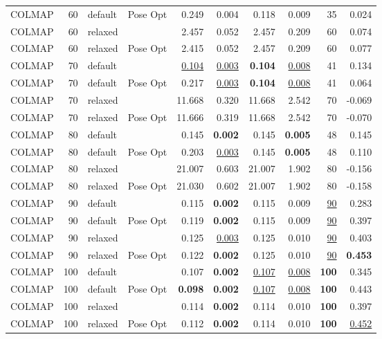 \begin{table}[H]
\begin{tabular}{lrllrrrrrr}
COLMAP & 60 & default & Pose Opt & 0.249 & 0.004 & 0.118 & 0.009 & 35 & 0.024 \\
COLMAP & 60 & relaxed &  & 2.457 & 0.052 & 2.457 & 0.209 & 60 & 0.074 \\
COLMAP & 60 & relaxed & Pose Opt & 2.415 & 0.052 & 2.457 & 0.209 & 60 & 0.077 \\
COLMAP & 70 & default &  & \underline{0.104} & \underline{0.003} & \textbf{0.104} & \underline{0.008} & 41 & 0.134 \\
COLMAP & 70 & default & Pose Opt & 0.217 & \underline{0.003} & \textbf{0.104} & \underline{0.008} & 41 & 0.064 \\
COLMAP & 70 & relaxed &  & 11.668 & 0.320 & 11.668 & 2.542 & 70 & -0.069 \\
COLMAP & 70 & relaxed & Pose Opt & 11.666 & 0.319 & 11.668 & 2.542 & 70 & -0.070 \\
COLMAP & 80 & default &  & 0.145 & \textbf{0.002} & 0.145 & \textbf{0.005} & 48 & 0.145 \\
COLMAP & 80 & default & Pose Opt & 0.203 & \underline{0.003} & 0.145 & \textbf{0.005} & 48 & 0.110 \\
COLMAP & 80 & relaxed &  & 21.007 & 0.603 & 21.007 & 1.902 & 80 & -0.156 \\
COLMAP & 80 & relaxed & Pose Opt & 21.030 & 0.602 & 21.007 & 1.902 & 80 & -0.158 \\
COLMAP & 90 & default &  & 0.115 & \textbf{0.002} & 0.115 & 0.009 & \underline{90} & 0.283 \\
COLMAP & 90 & default & Pose Opt & 0.119 & \textbf{0.002} & 0.115 & 0.009 & \underline{90} & 0.397 \\
COLMAP & 90 & relaxed &  & 0.125 & \underline{0.003} & 0.125 & 0.010 & \underline{90} & 0.403 \\
COLMAP & 90 & relaxed & Pose Opt & 0.122 & \textbf{0.002} & 0.125 & 0.010 & \underline{90} & \textbf{0.453} \\
COLMAP & 100 & default &  & 0.107 & \textbf{0.002} & \underline{0.107} & \underline{0.008} & \textbf{100} & 0.345 \\
COLMAP & 100 & default & Pose Opt & \textbf{0.098} & \textbf{0.002} & \underline{0.107} & \underline{0.008} & \textbf{100} & 0.443 \\
COLMAP & 100 & relaxed &  & 0.114 & \textbf{0.002} & 0.114 & 0.010 & \textbf{100} & 0.397 \\
COLMAP & 100 & relaxed & Pose Opt & 0.112 & \textbf{0.002} & 0.114 & 0.010 & \textbf{100} & \underline{0.452} \\

\end{tabular}
\end{table}
